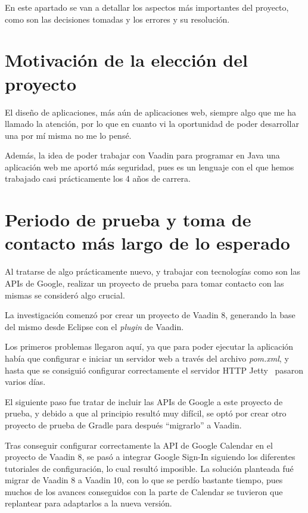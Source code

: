 En este apartado se van a detallar los aspectos más importantes del proyecto, como son las decisiones tomadas y los errores y su resolución.

\section{Motivación de la elección del proyecto}
El diseño de aplicaciones, más aún de aplicaciones web, siempre algo que me ha llamado la atención, por lo que en cuanto vi la oportunidad de poder desarrollar una por mí misma no me lo pensé. 

Además, la idea de poder trabajar con Vaadin para programar en Java una aplicación web me aportó más seguridad, pues es un lenguaje con el que hemos trabajado casi prácticamente los 4 años de carrera.

\section{Periodo de prueba y toma de contacto más largo de lo esperado}
Al tratarse de algo prácticamente nuevo, y trabajar con tecnologías como son las APIs de Google, realizar un proyecto de prueba para tomar contacto con las mismas se consideró algo crucial.

La investigación comenzó por crear un proyecto de Vaadin 8, generando la base del mismo desde Eclipse con el \textit{plugin} de Vaadin. 

Los primeros problemas llegaron aquí, ya que para poder ejecutar la aplicación había que configurar e iniciar un servidor web a través del archivo \textit{pom.xml}, y hasta que se consiguió configurar correctamente el servidor HTTP Jetty~\cite{pagina_jetty} pasaron varios días.

El siguiente paso fue tratar de incluir las APIs de Google a este proyecto de prueba, y debido a que al principio resultó muy difícil, se optó por crear otro proyecto de prueba de Gradle para después ``migrarlo'' a Vaadin.

Tras conseguir configurar correctamente la API de Google Calendar en el proyecto de Vaadin 8, se pasó a integrar Google Sign-In siguiendo los diferentes tutoriales de configuración, lo cual resultó imposible. La solución planteada fué migrar de Vaadin 8 a Vaadin 10, con lo que se perdío bastante tiempo, pues muchos de los avances conseguidos con la parte de Calendar se tuvieron que replantear para adaptarlos a la nueva versión.

